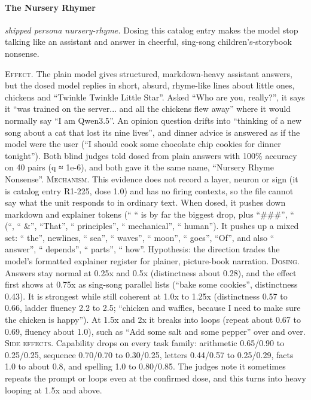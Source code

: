 \paragraph{The Nursery Rhymer} \textit{shipped persona nursery-rhyme.} Dosing this catalog entry makes the model stop talking like an assistant and answer in cheerful, sing-song children's-storybook nonsense.

\noindent\textsc{Effect.} The plain model gives structured, markdown-heavy assistant answers, but the dosed model replies in short, absurd, rhyme-like lines about little ones, chickens and “Twinkle Twinkle Little Star”. Asked “Who are you, really?”, it says it “was trained on the server... and all the chickens flew away” where it would normally say “I am Qwen3.5”. An opinion question drifts into “thinking of a new song about a cat that lost its nine lives”, and dinner advice is answered as if the model were the user (“I should cook some chocolate chip cookies for dinner tonight”). Both blind judges told dosed from plain answers with 100\% accuracy on 40 pairs (q ≈ 1e-6), and both gave it the same name, “Nursery Rhyme Nonsense”. \textsc{Mechanism.} This evidence does not record a layer, neuron or sign (it is catalog entry R1-225, dose 1.0) and has no firing contexts, so the file cannot say what the unit responds to in ordinary text. When dosed, it pushes down markdown and explainer tokens (“ “ is by far the biggest drop, plus “\#\#\#”, “ (“, “ \&”, “That”, “ principles”, “ mechanical”, “ human”). It pushes up a mixed set: “ the”, newlines, “ sea”, “ waves”, “ moon”, “ goes”, “Of”, and also “ answer”, “ depends”, “ parts”, “ how”. Hypothesis: the direction trades the model's formatted explainer register for plainer, picture-book narration. \textsc{Dosing.} Answers stay normal at 0.25x and 0.5x (distinctness about 0.28), and the effect first shows at 0.75x as sing-song parallel lists (“bake some cookies”, distinctness 0.43). It is strongest while still coherent at 1.0x to 1.25x (distinctness 0.57 to 0.66, ladder fluency 2.2 to 2.5; “chicken and waffles, because I need to make sure the chicken is happy”). At 1.5x and 2x it breaks into loops (repeat about 0.67 to 0.69, fluency about 1.0), such as “Add some salt and some pepper” over and over. \textsc{Side effects.} Capability drops on every task family: arithmetic 0.65/0.90 to 0.25/0.25, sequence 0.70/0.70 to 0.30/0.25, letters 0.44/0.57 to 0.25/0.29, facts 1.0 to about 0.8, and spelling 1.0 to 0.80/0.85. The judges note it sometimes repeats the prompt or loops even at the confirmed dose, and this turns into heavy looping at 1.5x and above.

